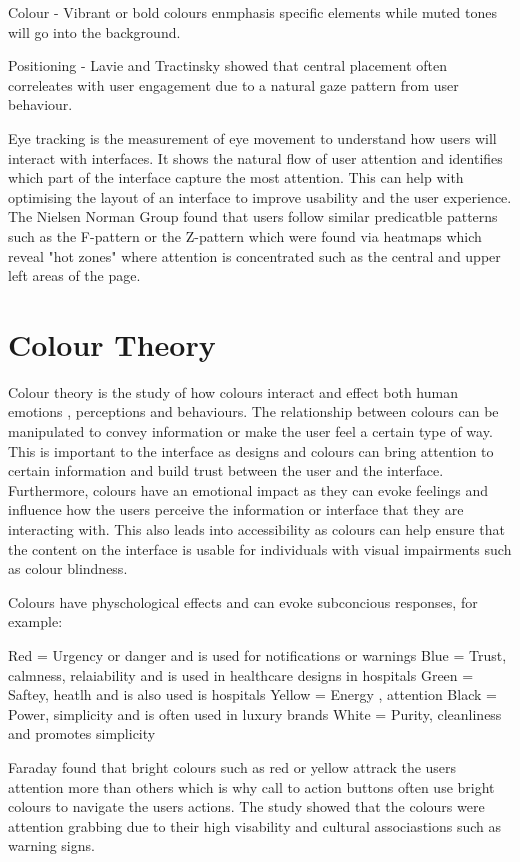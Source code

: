 \documentclass[]{project_interim}
\begin{document}
Colour - Vibrant or bold colours enmphasis specific elements while muted tones will go into the background.

Positioning - Lavie and Tractinsky showed that central placement often correleates with user engagement due to a natural gaze pattern from user behaviour.
\cite{djamasbi_eye_2014}\cite{djamasbi_generation_2010}

Eye tracking is the measurement of eye movement to understand how users will interact with interfaces. It shows the natural flow of user attention and identifies which part of the interface capture the most attention. This can help with optimising the layout of an interface to improve usability and the user experience. The Nielsen Norman Group found that users follow similar predicatble patterns such as the F-pattern or the Z-pattern which were found via heatmaps which reveal "hot zones" where attention is concentrated such as the central and upper left areas of the page.



\section{Colour Theory}

Colour theory is the study of how colours interact and effect both human emotions , perceptions and behaviours. The relationship between colours can be manipulated to convey information or make the user feel a certain type of way. This is important to the interface as designs and colours can bring attention to certain information and build trust between the user and the interface.
Furthermore, colours have an emotional impact as they can evoke feelings and influence how the users perceive the information or interface that they are interacting with. This also leads into accessibility as colours can help ensure that the content on the interface is usable for individuals with visual impairments such as colour blindness.\cite{cyr_colour_2010}

Colours have physchological effects and can evoke subconcious responses, for example:

Red = Urgency or danger and is used for notifications or warnings
Blue = Trust, calmness, relaiability and is used in healthcare designs in hospitals
Green = Saftey, heatlh and is also used is hospitals
Yellow = Energy , attention
Black = Power, simplicity and is often used in luxury brands
White = Purity, cleanliness and promotes simplicity

Faraday found that bright colours such as red or yellow attrack the users attention more than others  which is why call to action buttons often use bright colours to navigate the users actions. The study showed that the colours were attention grabbing due to their high visability and cultural associastions such as warning signs.
\end{document}
